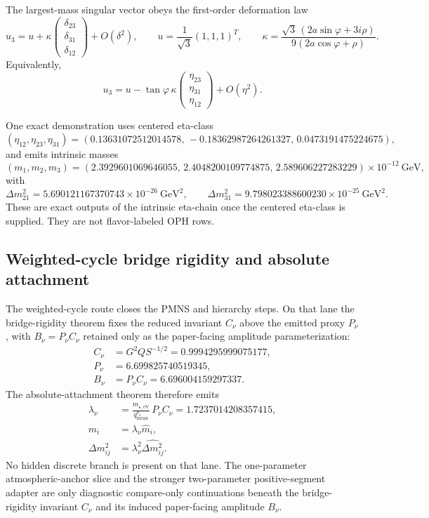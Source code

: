 \documentclass[11pt]{article}
\begin{document}
The largest-mass singular vector obeys the first-order deformation law
\[
u_3=
u+
\kappa
\begin{pmatrix}
\delta_{23}\\
\delta_{31}\\
\delta_{12}
\end{pmatrix}
+O(\delta^2),
\qquad
u=\frac1{\sqrt3}(1,1,1)^T,
\qquad
\kappa=
\frac{\sqrt3\,(2a\sin\varphi+3i\rho)}
 {9(2a\cos\varphi+\rho)}.
\]
Equivalently,
\[
u_3=
u-
\tan\varphi\,\kappa
\begin{pmatrix}
\eta_{23}\\
\eta_{31}\\
\eta_{12}
\end{pmatrix}
+O(\eta^2).
\]

One exact demonstration uses centered eta-class
\[
(\eta_{12},\eta_{23},\eta_{31})
=
(0.13631072512014578,\,-0.18362987264261327,\,0.0473191475224675),
\]
and emits intrinsic masses
\[
(m_1,m_2,m_3)=
(2.3929601069646055,\,
2.4048200109774875,\,
2.589606227283229)\times10^{-12}\ \mathrm{GeV},
\]
with
\[
\Delta m_{21}^2 = 5.690121167370743\times10^{-26}\ \mathrm{GeV}^2,
\qquad
\Delta m_{31}^2 = 9.798023388600230\times10^{-25}\ \mathrm{GeV}^2.
\]
These are exact outputs of the intrinsic eta-chain once the centered eta-class is supplied. They
are not flavor-labeled OPH rows.

\subsection{Weighted-cycle bridge rigidity and absolute attachment}

The weighted-cycle route closes the PMNS and hierarchy steps. On that lane the
bridge-rigidity theorem fixes the reduced invariant \(C_\nu\) above the emitted
proxy \(P_\nu\), with \(B_\nu=P_\nu C_\nu\) retained only as the paper-facing
amplitude parameterization:
\[
\begin{aligned}
C_\nu&=G^2Q S^{-1/2}=0.9994295999075177,\\
P_\nu&=6.699825740519345,\\
B_\nu&=P_\nu C_\nu=6.696004159297337.
\end{aligned}
\]
The absolute-attachment theorem therefore emits
\[
\begin{aligned}
\lambda_\nu&=\frac{m_{\star,\mathrm{eV}}}{q_{\mathrm{mean}}^{p_\nu}}\,P_\nu C_\nu=1.7237014208357415,\\
m_i&=\lambda_\nu \hat m_i,\\
\Delta m_{ij}^2&=\lambda_\nu^2\widehat{\Delta m_{ij}^2}.
\end{aligned}
\]
No hidden discrete branch is present on that lane. The one-parameter atmospheric-anchor slice and
the stronger two-parameter positive-segment adapter are only diagnostic compare-only
continuations beneath the bridge-rigidity invariant \(C_\nu\) and its induced paper-facing amplitude \(B_\nu\).
\end{document}
